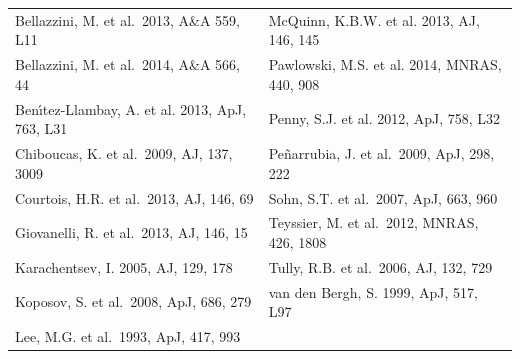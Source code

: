 {\small
\begin{table}[h]
\begin{tabular}{ll}
Bellazzini, M. et al.\  2013, A\&A 559, L11                 &           McQuinn, K.B.W. et al. 2013, AJ, 146, 145\\				    
Bellazzini, M. et al.\  2014, A\&A 566, 44 		    &		Pawlowski, M.S. et al. 2014, MNRAS, 440, 908\\		    
Ben{\'{\i}}tez-Llambay, A. et al. 2013, ApJ, 763, L31	    &		Penny, S.J. et al. 2012, ApJ, 758, L32\\				    
Chiboucas, K. et al.\  2009, AJ, 137, 3009 		    &		Pe{\~n}arrubia, J. et al.\ 2009, ApJ, 298, 222 \\			    
Courtois, H.R. et al.\ 2013, AJ, 146, 69 		    &		Sohn, S.T. et al.\ 2007, ApJ, 663, 960\\				    
Giovanelli, R. et al.\ 2013, AJ, 146, 15 		    &		Teyssier, M. et al.\ 2012, MNRAS, 426, 1808\\				    
Karachentsev, I. 2005, AJ, 129, 178			    &		Tully, R.B. et al.\ 2006, AJ, 132, 729\\				    
Koposov, S. et al.\ 2008, ApJ, 686, 279                     &		van den Bergh, S. 1999, ApJ, 517, L97\\                                     
Lee, M.G. et al.\ 1993, ApJ, 417, 993 &		
\end{tabular}
\end{table}
}
